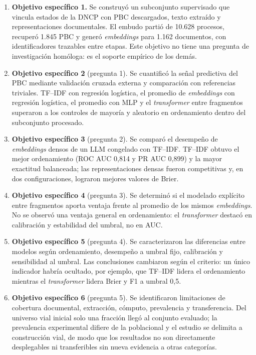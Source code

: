 \begin{enumerate}
  \item \textbf{Objetivo específico 1.} Se construyó un subconjunto supervisado que vincula estados de la DNCP con PBC descargados, texto extraído y representaciones documentales. El embudo partió de 10.628 procesos, recuperó 1.845 PBC y generó \textit{embeddings} para 1.162 documentos, con identificadores trazables entre etapas. Este objetivo no tiene una pregunta de investigación homóloga: es el soporte empírico de los demás.
  \item \textbf{Objetivo específico 2} (pregunta 1). Se cuantificó la señal predictiva del PBC mediante validación cruzada externa y comparación con referencias triviales. TF--IDF con regresión logística, el promedio de \textit{embeddings} con regresión logística, el promedio con MLP y el \textit{transformer} entre fragmentos superaron a los controles de mayoría y aleatorio en ordenamiento dentro del subconjunto procesado.
  \item \textbf{Objetivo específico 3} (pregunta 2). Se comparó el desempeño de \textit{embeddings} densos de un LLM congelado con TF--IDF. TF--IDF obtuvo el mejor ordenamiento (ROC AUC 0,814 y PR AUC 0,899) y la mayor exactitud balanceada; las representaciones densas fueron competitivas y, en dos configuraciones, lograron mejores valores de Brier.
  \item \textbf{Objetivo específico 4} (pregunta 3). Se determinó si el modelado explícito entre fragmentos aporta ventaja frente al promedio de los mismos \textit{embeddings}. No se observó una ventaja general en ordenamiento: el \textit{transformer} destacó en calibración y estabilidad del umbral, no en AUC.
  \item \textbf{Objetivo específico 5} (pregunta 4). Se caracterizaron las diferencias entre modelos según ordenamiento, desempeño a umbral fijo, calibración y sensibilidad al umbral. Las conclusiones cambiaron según el criterio: un único indicador habría ocultado, por ejemplo, que TF--IDF lidera el ordenamiento mientras el \textit{transformer} lidera Brier y F1 a umbral 0,5.
  \item \textbf{Objetivo específico 6} (pregunta 5). Se identificaron limitaciones de cobertura documental, extracción, cómputo, prevalencia y transferencia. Del universo vial inicial solo una fracción llegó al conjunto evaluado; la prevalencia experimental difiere de la poblacional y el estudio se delimita a construcción vial, de modo que los resultados no son directamente desplegables ni transferibles sin nueva evidencia a otras categorías.
\end{enumerate}

